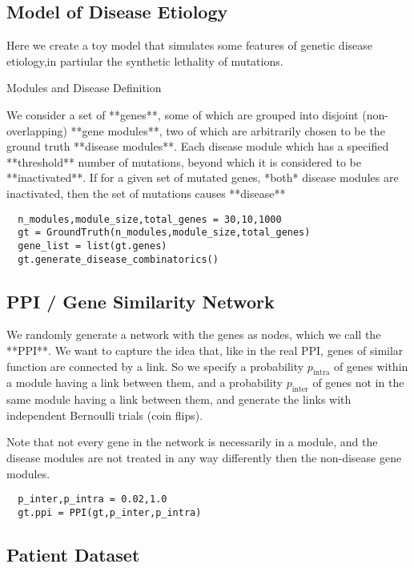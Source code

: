 \documentclass[a4paper,english]{article}
\begin{document}
\subsection{Model of Disease Etiology}
  Here we create a toy model that simulates some features of genetic disease etiology,in partiular the synthetic lethality of mutations.
      
  
Modules and Disease Definition
  
  We consider a set of **genes**, some of which are grouped into disjoint (non-overlapping) **gene modules**, two of which are arbitrarily chosen to be the ground truth **disease modules**.  Each disease module which has a specified **threshold** number of mutations, beyond which it is considered to be **inactivated**. If for a given set of mutated genes, *both* disease modules are inactivated, then the set of mutations causes **disease**
  
  
\begin{lstlisting}
  n_modules,module_size,total_genes = 30,10,1000
  gt = GroundTruth(n_modules,module_size,total_genes)
  gene_list = list(gt.genes)
  gt.generate_disease_combinatorics()
\end{lstlisting}
  
\subsection{PPI / Gene Similarity Network}
  
  We randomly generate a network with the genes as nodes, which we call the **PPI**. We want to capture the idea that, like in the real PPI, genes of similar function are connected by a link. So we specify a probability $p_{\mathrm{intra}}$ of genes within a module having a link between them, and a probability $p_{\mathrm{inter}}$ of genes not in the same module having a link between them, and generate the links with independent Bernoulli trials (coin flips). 
  
  Note that not every gene in the network is necessarily in a module, and the disease modules are not treated in any way differently then the non-disease gene modules.
  
\begin{lstlisting}
  p_inter,p_intra = 0.02,1.0
  gt.ppi = PPI(gt,p_inter,p_intra)
\end{lstlisting}
  
\subsection{Patient Dataset}
  
\end{document}
